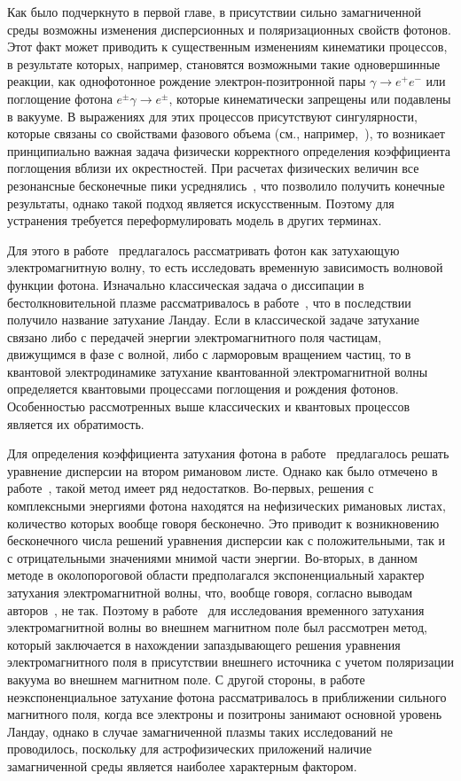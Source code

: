 Как было подчеркнуто в первой главе, в присутствии сильно замагниченной среды 
возможны изменения дисперсионных и поляризационных свойств фотонов. Этот факт 
может приводить к существенным изменениям кинематики процессов, в результате 
которых, например, становятся возможными такие одновершинные реакции, как однофотонное 
рождение электрон-позитронной пары $\gamma\to e^+e^-$ или поглощение фотона 
$e^{\pm}\gamma\to e^{\pm}$, которые кинематически запрещены или подавлены в 
вакууме. В выражениях для этих процессов присутствуют сингулярности, которые связаны со свойствами фазового объема (см., например,~\cite{Klepikov:1954,Sturrock:1971,Tademaru:1973,Daugherty:1983,Shabad:1988}), то возникает принципиально важная задача физически корректного определения коэффициента поглощения вблизи их окрестностей. При расчетах физических величин все резонансные бесконечные пики усреднялись~\cite{Baier:2007}, что позволило получить конечные результаты, однако такой подход является искусственным. Поэтому для устранения требуется переформулировать модель в других терминах.

Для этого в работе~\cite{Shabad:1988} предлагалось рассматривать фотон как затухающую электромагнитную волну, то есть исследовать временную зависимость волновой функции фотона. Изначально классическая задача о диссипации  в бестолкновительной плазме рассматривалось в работе~\cite{Landau:1946}, что в последствии получило название затухание Ландау. Если в классической задаче затухание связано либо с передачей энергии электромагнитного поля частицам, движущимся в фазе с волной, либо с ларморовым вращением частиц, то в квантовой электродинамике затухание квантованной электромагнитной волны определяется квантовыми процессами поглощения и рождения фотонов. Особенностью рассмотренных выше классических и квантовых процессов является их обратимость.

Для определения коэффициента затухания фотона в работе~\cite{Shabad:1988} предлагалось решать уравнение дисперсии на втором римановом листе. Однако как было отмечено в работе~\cite{MikhChist:2001}, такой метод имеет ряд недостатков. Во-первых, решения с комплексными энергиями фотона находятся на нефизических римановых листах, количество которых вообще говоря бесконечно. Это приводит к возникновению бесконечного числа решений уравнения дисперсии как с положительными, так и с отрицательными значениями мнимой части энергии. Во-вторых, в данном методе в околопороговой области предполагался экспоненциальный характер затухания электромагнитной волны, что, вообще говоря, согласно выводам авторов~\cite{MikhChist:2001}, не так. Поэтому в работе~\cite{MikhChist:2001} для исследования временного затухания электромагнитной волны во внешнем магнитном поле был рассмотрен метод, который заключается в нахождении запаздывающего решения уравнения электромагнитного поля в присутствии внешнего источника с учетом поляризации вакуума во внешнем магнитном поле. С другой стороны, в работе~\cite{MikhChist:2001} неэкспоненциальное затухание фотона рассматривалось в приближении сильного магнитного поля, когда все электроны и позитроны занимают основной уровень Ландау, однако в случае замагниченной плазмы таких исследований не проводилось, поскольку для астрофизических приложений наличие замагниченной среды является наиболее характерным фактором.



